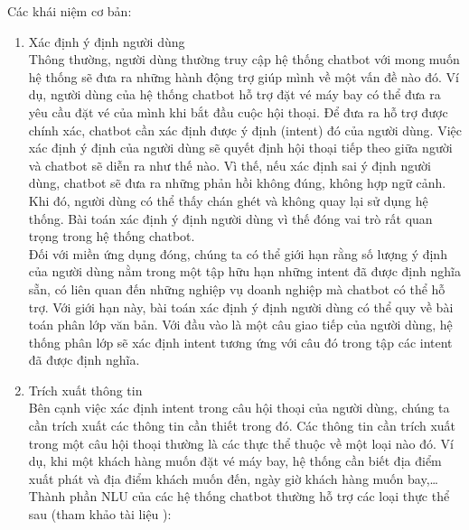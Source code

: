 Các khái niệm cơ bản:
\begin{enumerate}
    \item Xác định ý định người dùng
          \\
          Thông thường, người dùng thường truy cập hệ thống chatbot với mong muốn hệ thống sẽ đưa ra những hành động trợ giúp mình về một vấn đề nào đó. Ví dụ, người dùng của hệ thống chatbot hỗ trợ đặt vé máy bay có thể đưa ra yêu cầu đặt vé của mình khi bắt đầu cuộc hội thoại. Để đưa ra hỗ trợ được chính xác, chatbot cần xác định được ý định (intent) đó của người dùng. Việc xác định ý định của người dùng sẽ quyết định hội thoại tiếp theo giữa người và chatbot sẽ diễn ra như thế nào. Vì thế, nếu xác định sai ý định người dùng, chatbot sẽ đưa ra những phản hồi không đúng, không hợp ngữ cảnh. Khi đó, người dùng có thể thấy chán ghét và không quay lại sử dụng hệ thống. Bài toán xác định ý định người dùng vì thế đóng vai trò rất quan trọng trong hệ thống chatbot.
          \\
          Đối với miền ứng dụng đóng, chúng ta có thể giới hạn rằng số lượng ý định của người dùng nằm trong một tập hữu hạn những intent đã được định nghĩa sẵn, có liên quan đến những nghiệp vụ doanh nghiệp mà chatbot có thể hỗ trợ. Với giới hạn này, bài toán xác định ý định người dùng có thể quy về bài toán phân lớp văn bản. Với đầu vào là một câu giao tiếp của người dùng, hệ thống phân lớp sẽ xác định intent tương ứng với câu đó trong tập các intent đã được định nghĩa.
    \item Trích xuất thông tin
          \\
          Bên cạnh việc xác định intent trong câu hội thoại của người dùng, chúng ta cần trích xuất các thông tin cần thiết trong đó. Các thông tin cần trích xuất trong một câu hội thoại thường là các thực thể thuộc về một loại nào đó. Ví dụ, khi một khách hàng muốn đặt vé máy bay, hệ thống cần biết địa điểm xuất phát và địa điểm khách muốn đến, ngày giờ khách hàng muốn bay,…Thành phần NLU của các hệ thống chatbot thường hỗ trợ các loại thực thể sau (tham khảo tài liệu \cite{1}):


\end{enumerate}
